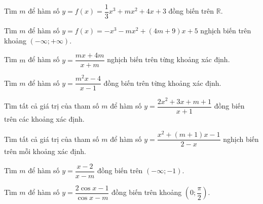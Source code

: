 \begin{vd}%
 Tìm $m$ để hàm số $y=f(x)=\dfrac{1}{3}x^3+mx^2+4x+3$ đồng biến trên $\mathbb{R}$.
 \loigiai{}
\end{vd}
\begin{vd}%
 Tìm $m$ để hàm số $y=f(x)=-x^3-m x^2+(4 m+9) x+5$ nghịch biến trên khoảng $(-\infty ;+\infty)$.
 \loigiai{}
\end{vd}
\begin{vd}%
 Tìm $m$ để hàm số $y=\dfrac{mx+4m}{x+m}$ nghịch biến trên từng khoảng xác định.
 \loigiai{}
\end{vd}
\begin{vd}%
 Tìm $m$ để hàm số $y=\dfrac{m^2x-4}{x-1}$ đồng biến trên từng khoảng xác định.
 \loigiai{}
\end{vd}
\begin{vd}
 Tìm tất cả giá trị của tham số $m$ để hàm số
 $ y = \dfrac{2x^2+3x+m+1}{x+1} $ đồng biến trên các khoảng xác định.
\end{vd}
\begin{vd}
 Tìm tất cả giá trị của tham số $m$ để hàm số
 $y=\dfrac{x^2+(m+1)x-1}{2-x}$ nghịch biến trên mỗi khoảng xác định.
\end{vd}
\begin{vd}%
 Tìm $m$ để hàm số $y=\dfrac{x-2}{x-m}$ đồng biến trên $(-\infty ;-1)$.
 \loigiai{}
\end{vd}
\begin{vd}%
 Tìm $m$ để hàm số $y=\dfrac{2\cos x-1}{\cos x-m}$ đồng biến trên khoảng $\left(0;\dfrac{\pi}{2}\right)$.
 \loigiai{}
\end{vd}
